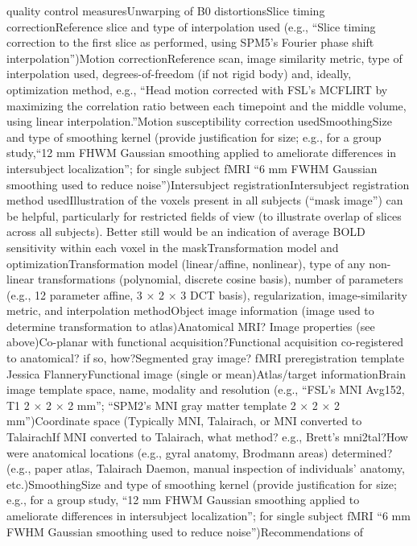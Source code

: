 \documentclass[]{article}
\begin{document}
quality control measuresUnwarping of B0 distortionsSlice timing
correctionReference slice and type of interpolation used (e.g., ``Slice
timing correction to the first slice as performed, using SPM5's Fourier
phase shift interpolation'')Motion correctionReference scan, image
similarity metric, type of interpolation used, degrees-of-freedom (if
not rigid body) and, ideally, optimization method, e.g., ``Head motion
corrected with FSL's MCFLIRT by maximizing the correlation ratio between
each timepoint and the middle volume, using linear
interpolation.''Motion susceptibility correction usedSmoothingSize and
type of smoothing kernel (provide justification for size; e.g., for a
group study,``12 mm FHWM Gaussian smoothing applied to ameliorate
differences in intersubject localization''; for single subject fMRI ``6
mm FWHM Gaussian smoothing used to reduce noise'')Intersubject
registrationIntersubject registration method usedIllustration of the
voxels present in all subjects (``mask image'') can be helpful,
particularly for restricted fields of view (to illustrate overlap of
slices across all subjects). Better still would be an indication of
average BOLD sensitivity within each voxel in the maskTransformation
model and optimizationTransformation model (linear/affine, nonlinear),
type of any non-linear transformations (polynomial, discrete cosine
basis), number of parameters (e.g., 12 parameter affine, 3 × 2 × 3 DCT
basis), regularization, image-similarity metric, and interpolation
methodObject image information (image used to determine transformation
to atlas)Anatomical MRI? Image properties (see above)Co-planar with
functional acquisition?Functional acquisition co-registered to
anatomical? if so, how?Segmented gray image? fMRI preregistration
template \textbar{} Jessica FlanneryFunctional image (single or
mean)Atlas/target informationBrain image template space, name, modality
and resolution (e.g., ``FSL's MNI Avg152, T1 2 × 2 × 2 mm''; ``SPM2's
MNI gray matter template 2 × 2 × 2 mm'')Coordinate space (Typically MNI,
Talairach, or MNI converted to TalairachIf MNI converted to Talairach,
what method? e.g., Brett's mni2tal?How were anatomical locations (e.g.,
gyral anatomy, Brodmann areas) determined? (e.g., paper atlas, Talairach
Daemon, manual inspection of individuals' anatomy, etc.)SmoothingSize
and type of smoothing kernel (provide justification for size; e.g., for
a group study, ``12 mm FHWM Gaussian smoothing applied to ameliorate
differences in intersubject localization''; for single subject fMRI ``6
mm FWHM Gaussian smoothing used to reduce noise'')Recommendations of
\end{document}
